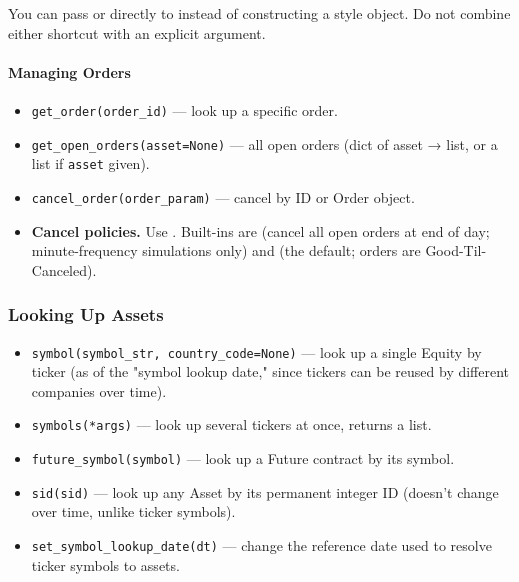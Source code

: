 \documentclass[12pt,openany]{book}
\theoremstyle{definition}
\theoremstyle{remark}
\begin{document}
You can pass  or  directly to
 instead of constructing a style object. Do not combine either
shortcut with an explicit  argument.

\paragraph{Managing Orders}

\begin{itemize}
\item 
\texttt{get\_order(order\_id)} — look up a specific order.

\item 
\texttt{get\_open\_orders(asset=None)} — all open orders (dict of asset → list, or a list if \texttt{asset} given).

\item 
\texttt{cancel\_order(order\_param)} — cancel by ID or Order object.

\item 
\textbf{Cancel policies.} Use .
Built-ins are  (cancel all open orders at end of day;
minute-frequency simulations only) and  (the default;
orders are Good-Til-Canceled).

\end{itemize}
\subsubsection{Looking Up Assets}

\begin{itemize}
\item 
\texttt{symbol(symbol\_str, country\_code=None)} — look up a single Equity by ticker (as of the "symbol lookup date," since tickers can be reused by different companies over time).

\item 
\texttt{symbols(*args)} — look up several tickers at once, returns a list.

\item 
\texttt{future\_symbol(symbol)} — look up a Future contract by its symbol.

\item 
\texttt{sid(sid)} — look up any Asset by its permanent integer ID (doesn't change over time, unlike ticker symbols).

\item 
\texttt{set\_symbol\_lookup\_date(dt)} — change the reference date used to resolve ticker symbols to assets.

\end{itemize}
\end{document}
